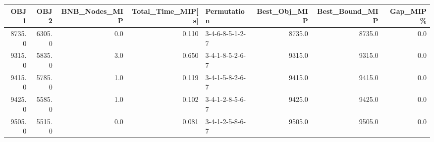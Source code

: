 \begin{tabular}{rrrrlrrr}
\toprule
   OBJ1 &    OBJ2 &  BNB\_Nodes\_MIP &  Total\_Time\_MIP[s] &      Permutation &  Best\_Obj\_MIP &  Best\_Bound\_MIP &  Gap\_MIP\% \\
\midrule
 8735.0 &  6305.0 &            0.0 &              0.110 &  3-4-6-8-5-1-2-7 &        8735.0 &          8735.0 &       0.0 \\
 9315.0 &  5835.0 &            3.0 &              0.650 &  3-4-1-8-5-2-6-7 &        9315.0 &          9315.0 &       0.0 \\
 9415.0 &  5785.0 &            1.0 &              0.119 &  3-4-1-5-8-2-6-7 &        9415.0 &          9415.0 &       0.0 \\
 9425.0 &  5585.0 &            1.0 &              0.102 &  3-4-1-2-8-5-6-7 &        9425.0 &          9425.0 &       0.0 \\
 9505.0 &  5515.0 &            0.0 &              0.081 &  3-4-1-2-5-8-6-7 &        9505.0 &          9505.0 &       0.0 \\
\bottomrule
\end{tabular}
